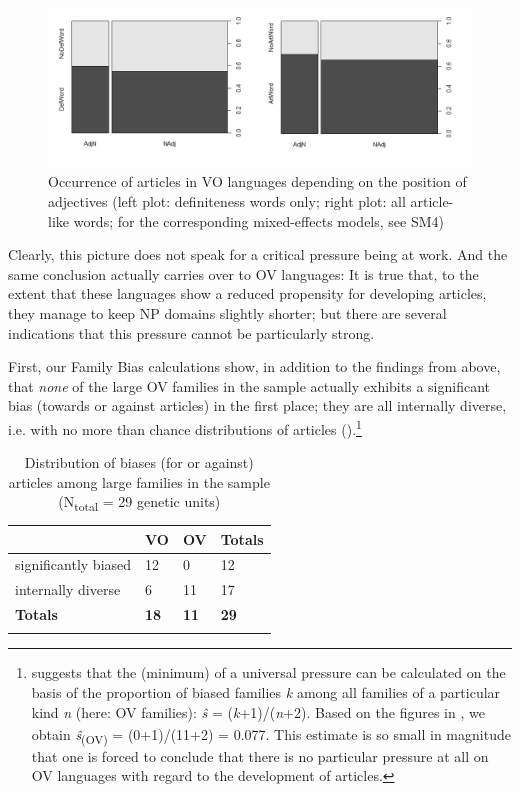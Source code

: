 \documentclass[output=paper]{langsci/langscibook}
\begin{document}
  

\begin{figure}
\includegraphics[width=\textwidth]{figures/schmidtkebode-img4.png}
\caption{Occurrence of articles in VO languages depending on the position of adjectives (left plot: definiteness words only; right plot: all article-like words; for the corresponding mixed-effects models, see SM4)}
\label{fig:ksb:4}
\end{figure}

Clearly, this picture does not speak for a critical  pressure being at work. And the same conclusion actually carries over to OV languages: It is true that, to the extent that these languages show a reduced propensity for developing articles, they manage to keep NP  domains slightly shorter; but there are several indications that this pressure cannot be particularly strong. 

First, our Family Bias calculations show, in addition to the findings from above, that \textit{none} of the large OV families in the sample actually exhibits a significant bias (towards or against articles) in the first place; they are all internally diverse, i.e. with no more than chance distributions of articles ().\footnote{\citet{Bickel2013_Fam} suggests that the (minimum)  of a universal pressure can be calculated on the basis of the proportion of biased families \textit{k} among all families of a particular kind \textit{n} (here: OV families): \textit{\^s}\textsubscript{} =\textsubscript{} (\textit{k}+1)/(\textit{n}+2). Based on the figures in , we obtain \textit{\^s}\textsubscript{(OV)} = (0+1)/(11+2) = 0.077. This estimate is so small in magnitude that one is forced to conclude that there is no particular pressure at all on OV languages with regard to the development of articles.} 

\begin{table}
\begin{tabularx}{.8\textwidth}{lYYY}
\lsptoprule
& VO & OV &  Totals\\
\midrule
significantly biased & 12 & 0 & 12\\
internally diverse & 6 & 11 & 17\\
\midrule
\textbf{Totals} & \textbf{18} & \textbf{11} & \textbf{29}\\
\lspbottomrule
\end{tabularx}
\caption{Distribution of biases (for or against) articles among large families in the sample (N\textsubscript{total} = 29 genetic units)}
\label{tab:ksb:4}
\end{table}
\end{document}
